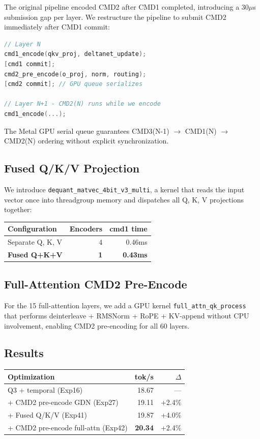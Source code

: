 \documentclass[11pt,twocolumn]{article}
\begin{document}
The original pipeline encoded CMD2 after CMD1 completed, introducing a 30$\mu$s submission gap per layer. We restructure the pipeline to submit CMD2 immediately after CMD1 commit:

\begin{lstlisting}[language=C,caption=Pre-encoded CMD2 submission]
// Layer N
cmd1_encode(qkv_proj, deltanet_update);
[cmd1 commit];
cmd2_pre_encode(o_proj, norm, routing);
[cmd2 commit]; // GPU queue serializes

// Layer N+1 - CMD2(N) runs while we encode
cmd1_encode(...);
\end{lstlisting}

The Metal GPU serial queue guarantees CMD3(N-1) $\rightarrow$ CMD1(N) $\rightarrow$ CMD2(N) ordering without explicit synchronization.

\subsection{Fused Q/K/V Projection}

We introduce \texttt{dequant\_matvec\_4bit\_v3\_multi}, a kernel that reads the input vector once into threadgroup memory and dispatches all Q, K, V projections together:

\begin{center}
\begin{tabular}{lrr}
\toprule
\textbf{Configuration} & \textbf{Encoders} & \textbf{cmd1 time} \\
\midrule
Separate Q, K, V & 4 & 0.46ms \\
\textbf{Fused Q+K+V} & \textbf{1} & \textbf{0.43ms} \\
\bottomrule
\end{tabular}
\end{center}

\subsection{Full-Attention CMD2 Pre-Encode}

For the 15 full-attention layers, we add a GPU kernel \texttt{full\_attn\_qk\_process} that performs deinterleave + RMSNorm + RoPE + KV-append without CPU involvement, enabling CMD2 pre-encoding for all 60 layers.

\subsection{Results}

\begin{center}
\begin{tabular}{lrr}
\toprule
\textbf{Optimization} & \textbf{tok/s} & \textbf{$\Delta$} \\
\midrule
Q3 + temporal (Exp16) & 18.67 & --- \\
+ CMD2 pre-encode GDN (Exp27) & 19.11 & +2.4\% \\
+ Fused Q/K/V (Exp41) & 19.87 & +4.0\% \\
+ CMD2 pre-encode full-attn (Exp42) & \textbf{20.34} & +2.4\% \\
\bottomrule
\end{tabular}
\end{center}
\end{document}
